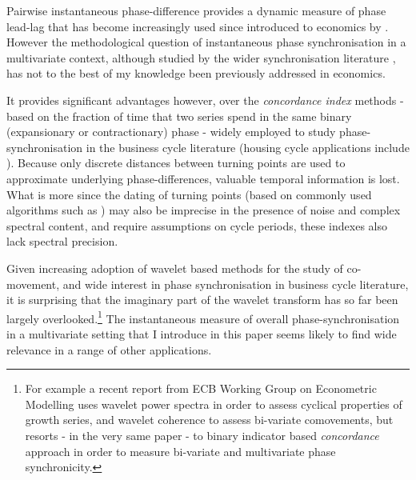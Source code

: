 \documentclass[11pt]{article}
\begin{document}
Pairwise instantaneous phase-difference provides a %
dynamic measure of phase lead-lag that has become increasingly used since introduced to economics by  \citep{Soares2011}. %
However the methodological question of instantaneous phase synchronisation in a multivariate context, although studied by the wider synchronisation literature \citep{Pikovsky2001,Rosenblum2001,Rodrigues2015,Arenas2008,Schroder2017}, has not to the best of my knowledge been previously addressed in economics. %


It provides significant advantages however, over the \textit{concordance index} methods \cite{Harding2002,Harding2003,Harding2006,Mink2012,Bordon2013} - based on the fraction of time that two series spend in the same binary (expansionary or contractionary) phase - widely employed to study phase-synchronisation in the business cycle literature (housing cycle applications include \citep{Jackson2008,Alvarez2009,Hirata2013a,Miles2015a}). Because only discrete distances between turning points are used to approximate underlying phase-differences, valuable temporal information is lost. What is more since the dating of turning points (based on commonly used algorithms such as \cite{Bry1971}) may also be imprecise in the presence of noise and complex spectral content, and require assumptions on cycle periods, these indexes also lack spectral precision.

Given increasing adoption of wavelet based methods for the study of co-movement, and wide interest in phase synchronisation in business cycle literature, it is surprising that the imaginary part of the wavelet transform has so far been largely overlooked.\footnote{For example a recent report from ECB Working Group on Econometric Modelling \citep{EuropeanCentralBank-WorkingGrouponEconometricModelling2018} uses wavelet power spectra in order to assess cyclical properties of growth series, and wavelet coherence to assess bi-variate comovements, but resorts - in the very same paper - to binary indicator based \textit{concordance} approach in order to measure bi-variate and multivariate phase synchronicity.}
The instantaneous measure of overall phase-synchronisation in a multivariate setting that I introduce in this paper seems likely to find wide relevance in a range of other applications.
\end{document}
